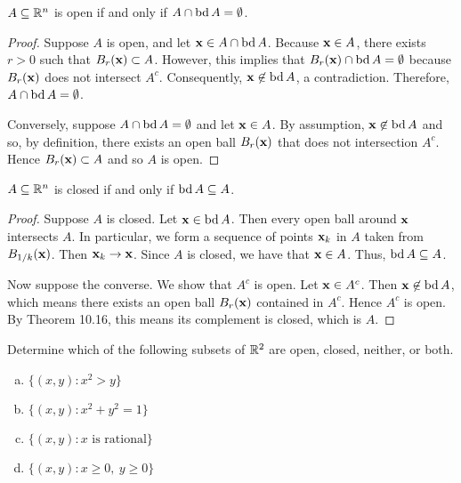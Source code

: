 \documentclass[letterpaper, twoside, 12pt]{book}
\begin{document}
\begin{proposition}[10.19.i]
  \(A\subseteq\mathbb R^n\) is open if and only if \(A\cap\operatorname{bd} A=\emptyset\).
\end{proposition}

\begin{proof}
    Suppose \(A\) is open, and let \(\mathbf x \in A \cap \operatorname{bd} A\). 
    Because \(\mathbf x \in A\), there exists \(r > 0\) such that 
    \(B_{r}(\mathbf x) \subset A\). However, this implies that 
    \(B_{r}(\mathbf x) \cap \operatorname{bd} A = \emptyset\) because
    \(B_{r}(\mathbf x)\) does not intersect \(A^c\). Consequently,
    \(\mathbf x \not\in \operatorname{bd} A\), a contradiction. Therefore,
    \(A \cap \operatorname{bd} A = \emptyset \).

    Conversely, suppose \(A \cap \operatorname{bd} A = \emptyset\) and
    let \(\mathbf x \in A\). By assumption, \(\mathbf x \not\in \operatorname{bd} A\)
    and so, by definition, there exists an open ball \(B_r(\mathbf x)\)
    that does not intersection \(A^c\). Hence \(B_r(\mathbf x) \subset A\)
    and so \(A\) is open.
\end{proof}

\begin{proposition}[10.19.ii]
  \(A\subseteq\mathbb R^n\) is closed if and only if \(\operatorname{bd} A\subseteq A\).
\end{proposition}

\begin{proof}
    Suppose \(A\) is closed. Let \(\mathbf x \in \operatorname{bd} A\). Then
    every open ball around \(\mathbf x\) intersects \(A\). In particular,
    we form a sequence of points \(\mathbf x_k \) in \(A\) taken from
    \(B_{1/k}(\mathbf x)\). Then \(\mathbf x_k \to \mathbf x\). Since \(A\)
    is closed, we have that \(\mathbf x \in A\). Thus, \(\operatorname{bd} A \subseteq A\).

    Now suppose the converse. We show that \(A^c\) is open. Let \(\mathbf x \in A^c\).
    Then \(\mathbf x \not\in \operatorname{bd} A \), which means there exists an open
    ball \(B_r(\mathbf x)\) contained in \(A^c\). Hence \(A^c\) is open. By 
    Theorem 10.16, this means its complement is closed, which is \(A\).
\end{proof}

\begin{exercise}[2]
  Determine which of the following subsets of \(\mathbb R^2\) are open, closed,
  neither, or both.
  \begin{enumerate}[(a)]
    \item \(\{(x,y):x^2>y\}\)
    \item \(\{(x,y):x^2+y^2=1\}\)
    \item \(\{(x,y):x \text{~is rational}\}\)
    \item \(\{(x,y):x\geq 0,~y\geq0\}\)
  \end{enumerate}
\end{exercise}
\end{document}
